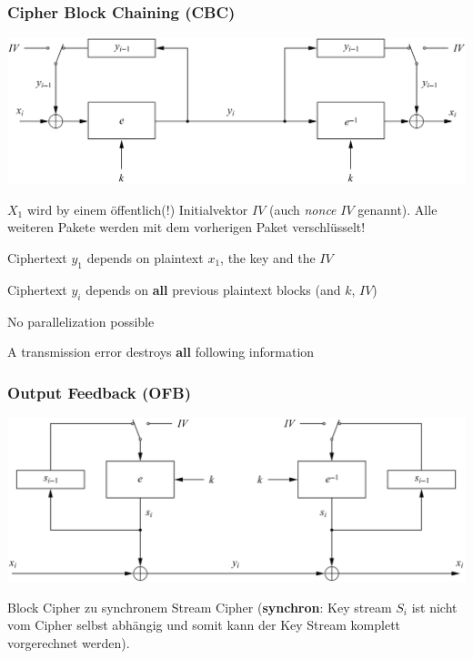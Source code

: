 \documentclass[
  10pt,
  a4paper,
]{article}
\begin{document}
\begin{multicols*}{2}
\subsubsection{Cipher Block Chaining
(CBC)}\label{cipher-block-chaining-cbc}

\includegraphics{images/crypto/image-1.png}

\(X_1\) wird by einem öffentlich(!) Initialvektor \(IV\) (auch
\emph{nonce} \(IV\) genannt). Alle weiteren Pakete werden mit dem
vorherigen Paket verschlüsselt!

{\footnotesize\begin{description}[parsep=0mm,labelsep=2pt,labelwidth=8pt]
  \item[\color{OliveGreen}\faPlus] Ciphertext $y_1$ depends on plaintext $x_1$, the key and the $IV$
  \item[\color{OliveGreen}\faPlus] Ciphertext $y_i$ depends on \textbf{all} previous plaintext blocks (and $k$, $IV$)
  \item[\color{BrickRed}\faMinus] No parallelization possible
  \item[\color{BrickRed}\faMinus] A transmission error destroys \textbf{all} following information
\end{description}}

\subsubsection{Output Feedback (OFB)}\label{output-feedback-ofb}

\includegraphics{images/crypto/image-2.png}

Block Cipher zu synchronem Stream Cipher (\textbf{synchron}: Key stream
\(S_i\) ist nicht vom Cipher selbst abhängig und somit kann der Key
Stream komplett vorgerechnet werden).


\end{multicols*}
\end{document}
